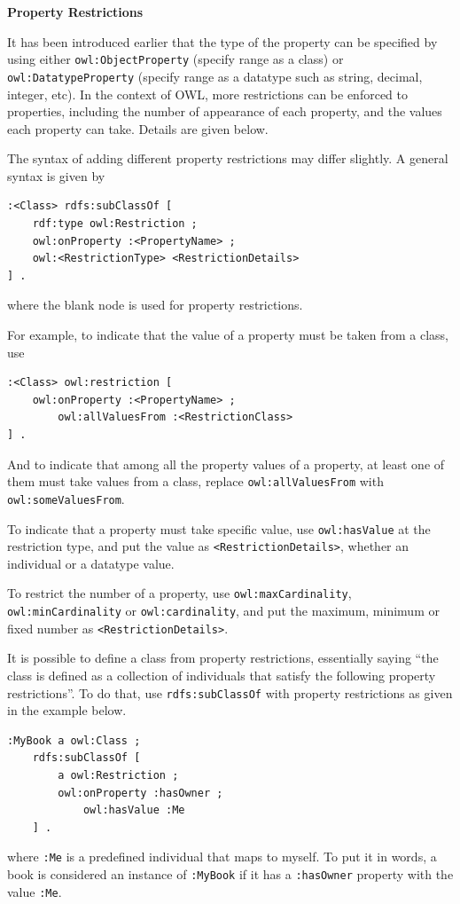 \vspace{0.1in}
\noindent \textbf{Property Restrictions}
\vspace{0.1in}

It has been introduced earlier that the type of the property can be specified by using either \verb|owl:ObjectProperty| (specify range as a class) or \verb|owl:DatatypeProperty| (specify range as a datatype such as string, decimal, integer, etc). In the context of OWL, more restrictions can be enforced to properties, including the number of appearance of each property, and the values each property can take. Details are given below.

The syntax of adding different property restrictions may differ slightly. A general syntax is given by
\begin{lstlisting}
:<Class> rdfs:subClassOf [
    rdf:type owl:Restriction ;
    owl:onProperty :<PropertyName> ;
    owl:<RestrictionType> <RestrictionDetails>
] .
\end{lstlisting}
where the blank node is used for property restrictions.

For example, to indicate that the value of a property must be taken from a class, use
\begin{lstlisting}
:<Class> owl:restriction [
	owl:onProperty :<PropertyName> ;
		owl:allValuesFrom :<RestrictionClass>
] .
\end{lstlisting}
And to indicate that among all the property values of a property, at least one of them must take values from a class, replace \verb|owl:allValuesFrom| with \verb|owl:someValuesFrom|.

To indicate that a property must take specific value, use \verb|owl:hasValue| at the restriction type, and put the value as \verb|<RestrictionDetails>|, whether an individual or a datatype value.

To restrict the number of a property, use \verb|owl:maxCardinality|, \verb|owl:minCardinality| or \verb|owl:cardinality|, and put the maximum, minimum or fixed number as \verb|<RestrictionDetails>|.

It is possible to define a class from property restrictions, essentially saying ``the class is defined as a collection of individuals that satisfy the following property restrictions''. To do that, use \verb|rdfs:subClassOf| with property restrictions as given in the example below.
\begin{lstlisting}
:MyBook a owl:Class ;
	rdfs:subClassOf [
		a owl:Restriction ;
		owl:onProperty :hasOwner ;
			owl:hasValue :Me
	] .
\end{lstlisting}
where \verb|:Me| is a predefined individual that maps to myself. To put it in words, a book is considered an instance of \verb|:MyBook| if it has a \verb|:hasOwner| property with the value \verb|:Me|.

